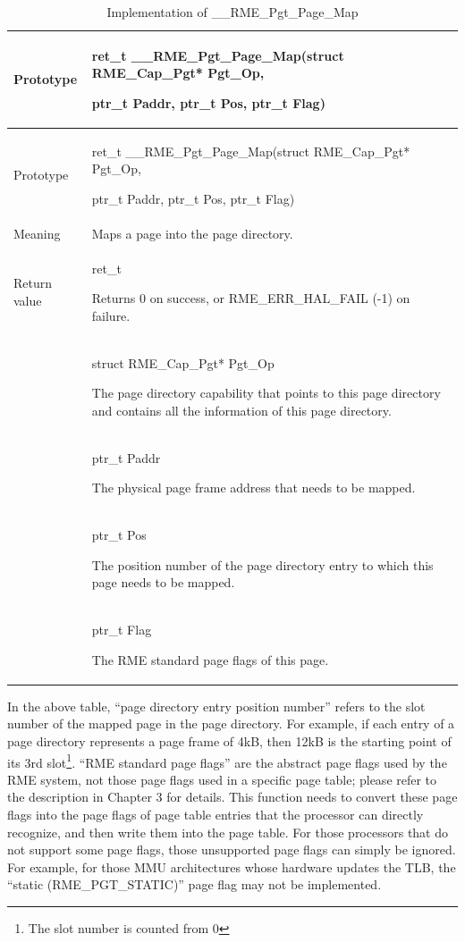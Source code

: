 \begin{xltabular}{\textwidth}{@{}>{\hsize\raggedright\arraybackslash}X>{\hsize\raggedright\arraybackslash}X@{}}
\caption{Implementation of \_\_RME\_Pgt\_Page\_Map}\label{tab:7-79-rme-pgt-page-map-implementation}\\
\toprule
Prototype\strut
 & ret\_t \_\_RME\_Pgt\_Page\_Map(struct RME\_Cap\_Pgt* Pgt\_Op,

ptr\_t Paddr, ptr\_t Pos, ptr\_t Flag)\strut
\tabularnewline
\endfirsthead
\toprule
Prototype\strut
 & ret\_t \_\_RME\_Pgt\_Page\_Map(struct RME\_Cap\_Pgt* Pgt\_Op,

ptr\_t Paddr, ptr\_t Pos, ptr\_t Flag)\strut
\tabularnewline
\midrule
\endhead
\bottomrule
\endlastfoot
Meaning & Maps a page into the page directory.\tabularnewline
Return value\strut
 & ret\_t

Returns 0 on success, or RME\_ERR\_HAL\_FAIL (-1) on failure.\strut
\tabularnewline
{} & struct RME\_Cap\_Pgt* Pgt\_Op

The page directory capability that points to this page directory and contains all the information of this page directory.\strut
\tabularnewline
\strut
 & ptr\_t Paddr

The physical page frame address that needs to be mapped.\strut
\tabularnewline
\strut
 & ptr\_t Pos

The position number of the page directory entry to which this page needs to be mapped.\strut
\tabularnewline
\strut
 & ptr\_t Flag

The RME standard page flags of this page.\strut
\tabularnewline
\end{xltabular}
\nopagebreak[4]

In the above table, ``page directory entry position number'' refers to the slot number of the mapped page in the page directory. For example, if each entry of a page directory represents a page frame of 4kB, then 12kB is the starting point of its 3rd slot\footnote{The slot number is counted from 0}. ``RME standard page flags'' are the abstract page flags used by the RME system, not those page flags used in a specific page table; please refer to the description in Chapter 3 for details. This function needs to convert these page flags into the page flags of page table entries that the processor can directly recognize, and then write them into the page table. For those processors that do not support some page flags, those unsupported page flags can simply be ignored. For example, for those MMU architectures whose hardware updates the TLB, the ``static (RME\_PGT\_STATIC)'' page flag may not be implemented.

